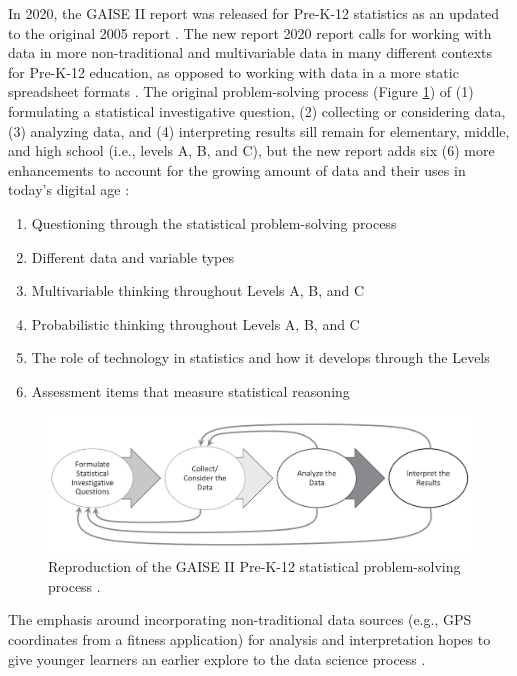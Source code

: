 \documentclass[010-intro.tex]{subfiles}
\begin{document}
    In 2020, the GAISE II report was released for Pre-K-12 statistics as an updated to the original 2005 report
    \cite{gaise2k12}.
    The new report 2020 report calls for working with data in more non-traditional and multivariable data in
    many different contexts for Pre-K-12 education, as opposed to working with data in a more static spreadsheet
    formats
    \cite{gaise2k12}.
    The original problem-solving process (Figure \ref{fig:gaisek-12}) of
    (1) formulating a statistical investigative question,
    (2) collecting or considering data,
    (3) analyzing data, and
    (4) interpreting results
    sill remain for elementary, middle, and high school (i.e., levels A, B, and C),
    but the new report adds six (6) more enhancements to account for the growing amount of
    data and their uses in today's digital age \cite{gaise2k12}:

    \begin{enumerate}
        \item Questioning through the statistical problem-solving process
        \item Different data and variable types
        \item Multivariable thinking throughout Levels A, B, and C
        \item Probabilistic thinking throughout Levels A, B, and C
        \item The role of technology in statistics and how it develops through the Levels
        \item Assessment items that measure statistical reasoning
    \end{enumerate}

    \begin{figure}[htb]
        \centering
        \includegraphics[width=\textwidth]{figs/050-intro/gaise2-stat_problem_solving_process.png}
        \caption[GAISE II Pre-K-12 Statistical Problem-Solving Process]{
        Reproduction of the GAISE II Pre-K-12 statistical problem-solving process \cite{gaise2k12}.
        }
        \label{fig:gaisek-12}
    \end{figure}

    The emphasis around incorporating non-traditional data sources
    (e.g., GPS coordinates from a fitness application)
    for analysis and interpretation
    hopes to give younger learners an earlier explore to the data science process
    \cite{gaise2k12}.
\end{document}
